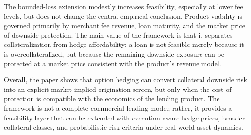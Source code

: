 \documentclass[11pt]{article}
\begin{document}
The bounded-loss extension modestly increases feasibility, especially at lower fee levels, but does not change the central empirical conclusion. Product viability is governed primarily by merchant fee revenue, loan maturity, and the market price of downside protection. The main value of the framework is that it separates collateralization from hedge affordability: a loan is not feasible merely because it is overcollateralized, but because the remaining downside exposure can be protected at a market price consistent with the product’s revenue model.

Overall, the paper shows that option hedging can convert collateral downside risk into an explicit market-implied origination screen, but only when the cost of protection is compatible with the economics of the lending product. The framework is not a complete commercial lending model; rather, it provides a feasibility layer that can be extended with execution-aware hedge prices, broader collateral classes, and probabilistic risk criteria under real-world asset dynamics.




\end{document}
